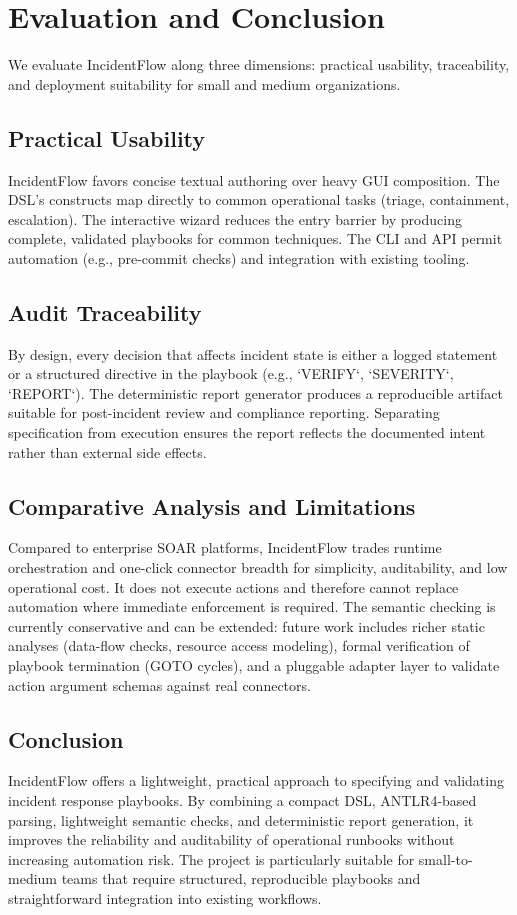 \documentclass[conference]{IEEEtran}
\begin{document}
\section{Evaluation and Conclusion}
We evaluate IncidentFlow along three dimensions: practical usability, traceability, and deployment suitability for small and medium organizations.

\subsection{Practical Usability}
IncidentFlow favors concise textual authoring over heavy GUI composition. The DSL's constructs map directly to common operational tasks (triage, containment, escalation). The interactive wizard reduces the entry barrier by producing complete, validated playbooks for common techniques. The CLI and API permit automation (e.g., pre-commit checks) and integration with existing tooling.

\subsection{Audit Traceability}
By design, every decision that affects incident state is either a logged statement or a structured directive in the playbook (e.g., `VERIFY`, `SEVERITY`, `REPORT`). The deterministic report generator produces a reproducible artifact suitable for post-incident review and compliance reporting. Separating specification from execution ensures the report reflects the documented intent rather than external side effects.

\subsection{Comparative Analysis and Limitations}
Compared to enterprise SOAR platforms, IncidentFlow trades runtime orchestration and one-click connector breadth for simplicity, auditability, and low operational cost. It does not execute actions and therefore cannot replace automation where immediate enforcement is required. The semantic checking is currently conservative and can be extended: future work includes richer static analyses (data-flow checks, resource access modeling), formal verification of playbook termination (GOTO cycles), and a pluggable adapter layer to validate action argument schemas against real connectors.

\subsection{Conclusion}
IncidentFlow offers a lightweight, practical approach to specifying and validating incident response playbooks. By combining a compact DSL, ANTLR4-based parsing, lightweight semantic checks, and deterministic report generation, it improves the reliability and auditability of operational runbooks without increasing automation risk. The project is particularly suitable for small-to-medium teams that require structured, reproducible playbooks and straightforward integration into existing workflows.



\end{document}
